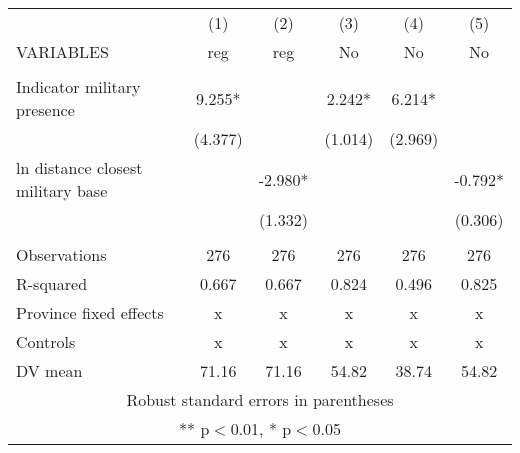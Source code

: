 \begin{tabular}{lccccc} \hline
 & (1) & (2) & (3) & (4) & (5) \\
VARIABLES & reg & reg & No & No & No \\ \hline
 &  &  &  &  &  \\
Indicator military presence & 9.255* &  & 2.242* & 6.214* &  \\
 & (4.377) &  & (1.014) & (2.969) &  \\
ln distance closest military base &  & -2.980* &  &  & -0.792* \\
 &  & (1.332) &  &  & (0.306) \\
 &  &  &  &  &  \\
Observations & 276 & 276 & 276 & 276 & 276 \\
R-squared & 0.667 & 0.667 & 0.824 & 0.496 & 0.825 \\
Province fixed effects & x & x & x & x & x \\
Controls & x & x & x & x & x \\
 DV mean & 71.16 & 71.16 & 54.82 & 38.74 & 54.82 \\ \hline
\multicolumn{6}{c}{ Robust standard errors in parentheses} \\
\multicolumn{6}{c}{ ** p$<$0.01, * p$<$0.05} \\
\end{tabular}
